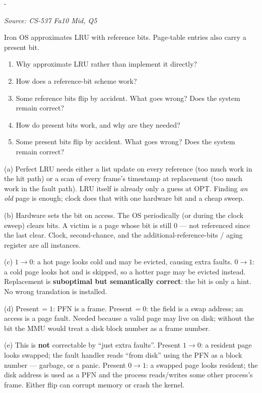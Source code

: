 \documentclass[11pt,a4paper]{article}
\makeatletter
\newcommand{\keepspace}[1]{\par\penalty-100\begingroup
  \setlength{\dimen@}{#1}\dimen@ii\pagegoal\advance\dimen@ii-\pagetotal
  \ifdim\dimen@>\dimen@ii\ifdim\dimen@ii>\z@\vfil\fi\break\fi\endgroup}
\newcounter{qn}[section]
\newenvironment{Qn}[4]{%
  \refstepcounter{qn}\keepspace{7\baselineskip}%
  \begin{tcolorbox}[qboxstyle, title={Q\thesection.\theqn\ \ [#1 \textbar\ #2]\ \ #4}]%
  {\footnotesize\color{g3}\textit{Source: #3}}\par\smallskip%
}{%
  \end{tcolorbox}%
}
\newenvironment{Sol}{%
  \begin{tcolorbox}[sboxstyle, title={Solution}]%
}{%
  \end{tcolorbox}\vspace{0.35em}%
}
\makeatother
\begin{document}
\begin{Qn}{Medium-Hard}{Lect 15}{CS-537 Fa10 Mid, Q5}{Why approximate LRU, how reference bits work, and bit-flip damage}
Iron OS approximates LRU with reference bits. Page-table entries also
carry a present bit.
\begin{enumerate}
  \item[(a)] Why approximate LRU rather than implement it directly?
  \item[(b)] How does a reference-bit scheme work?
  \item[(c)] Some reference bits flip by accident. What goes wrong? Does
        the system remain correct?
  \item[(d)] How do present bits work, and why are they needed?
  \item[(e)] Some present bits flip by accident. What goes wrong? Does
        the system remain correct?
\end{enumerate}
\end{Qn}
\begin{Sol}
(a) Perfect LRU needs either a list update on every reference (too much
work in the hit path) or a scan of every frame's timestamp at
replacement (too much work in the fault path). LRU itself is already
only a guess at OPT. Finding \emph{an old} page is enough; clock does
that with one hardware bit and a cheap sweep.

(b) Hardware sets the bit on access. The OS periodically (or during the
clock sweep) clears bits. A victim is a page whose bit is still 0 ---
not referenced since the last clear. Clock, second-chance, and the
additional-reference-bits / aging register are all instances.

(c) $1\to 0$: a hot page looks cold and may be evicted, causing extra
faults. $0\to 1$: a cold page looks hot and is skipped, so a hotter
page may be evicted instead. Replacement is \textbf{suboptimal but
semantically correct}: the bit is only a hint. No wrong translation is
installed.

(d) Present$\,=1$: PFN is a frame. Present$\,=0$: the field is a swap
address; an access is a page fault. Needed because a valid page may
live on disk; without the bit the MMU would treat a disk block number
as a frame number.

(e) This is \textbf{not} correctable by ``just extra faults''.
Present $1\to 0$: a resident page looks swapped; the fault handler
reads ``from disk'' using the PFN as a block number --- garbage, or a
panic. Present $0\to 1$: a swapped page looks resident; the disk
address is used as a PFN and the process reads/writes some other
process's frame. Either flip can corrupt memory or crash the kernel.
\end{Sol}
\end{document}
